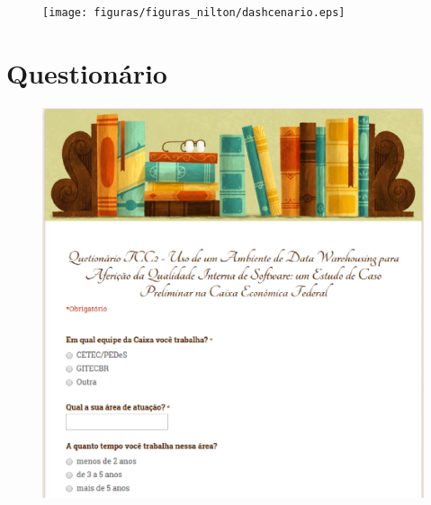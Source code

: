 \begin{apendicesenv}
\begin{figure}[h!]
\centering
\texttt{[image: figuras/figuras\_nilton/dashcenario.eps]}
\label{dashcenario}
\end{figure}


\chapter{Questionário}
\label{sec:questionário}

\begin{figure}[h!]
\centering
\includegraphics[keepaspectratio=false,scale=0.50]{figuras/figuras_nilton/questionario1.eps}
\label{questionario1}
\end{figure}


\end{apendicesenv}
